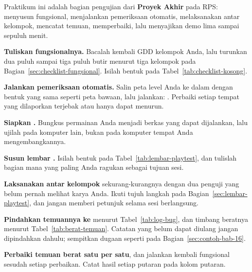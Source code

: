 \begin{praktikumbox}
Praktikum ini adalah bagian pengujian dari \textbf{Proyek Akhir} pada RPS:
menyusun  fungsional, menjalankan pemeriksaan otomatis,
melaksanakan  antar kelompok, mencatat temuan, memperbaiki,
lalu menyajikan demo lima sampai sepuluh menit.

\begin{langkah}
  \item \textbf{Tuliskan  fungsionalnya.} Bacalah kembali
        GDD kelompok Anda, lalu turunkan dua puluh sampai tiga puluh butir
        menurut tiga kelompok pada Bagian~\ref{sec:checklist-fungsional}.
        Isilah bentuk pada Tabel~\ref{tab:checklist-kosong}.

  \item \textbf{Jalankan pemeriksaan otomatis.} Salin peta level Anda ke dalam
         dengan bentuk yang sama seperti peta bawaan,
        lalu jalankan:
        . Perbaiki setiap
        tempat yang dilaporkan terjebak atau hanya dapat menurun.

  \item \textbf{Siapkan .} Bungkus permainan Anda menjadi berkas
        yang dapat dijalankan, lalu ujilah pada komputer lain, bukan pada
        komputer tempat Anda mengembangkannya.

  \item \textbf{Susun lembar .} Isilah bentuk pada
        Tabel~\ref{tab:lembar-playtest}, dan tulislah bagian mana yang paling
        Anda ragukan sebagai tujuan sesi.

  \item \textbf{Laksanakan  antar kelompok}
        sekurang-kurangnya dengan dua penguji yang belum pernah melihat karya
        Anda. Ikuti tujuh langkah pada Bagian~\ref{sec:lembar-playtest}, dan
        jangan memberi petunjuk selama sesi berlangsung.

  \item \textbf{Pindahkan temuannya ke } menurut
        Tabel~\ref{tab:log-bug}, dan timbang beratnya menurut
        Tabel~\ref{tab:berat-temuan}. Catatan yang belum dapat diulang jangan
        dipindahkan dahulu; sempitkan dugaan seperti pada
        Bagian~\ref{sec:contoh-bab-16}.

  \item \textbf{Perbaiki temuan berat satu per satu}, dan jalankan kembali
         fungsional sesudah setiap perbaikan. Catat hasil
        setiap putaran pada kolom putaran.


\end{langkah}
\end{praktikumbox}
